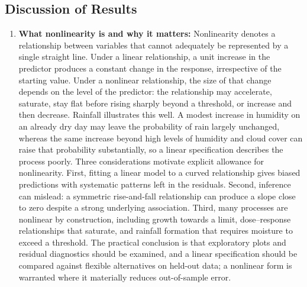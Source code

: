 \documentclass[conference]{IEEEtran}
\begin{document}
\subsection{Discussion of Results}
\begin{enumerate}
    \item \textbf{What nonlinearity is and why it matters:} Nonlinearity denotes a relationship between variables that cannot adequately be represented by a single straight line. Under a linear relationship, a unit increase in the predictor produces a constant change in the response, irrespective of the starting value. Under a nonlinear relationship, the size of that change depends on the level of the predictor: the relationship may accelerate, saturate, stay flat before rising sharply beyond a threshold, or increase and then decrease. Rainfall illustrates this well. A modest increase in humidity on an already dry day may leave the probability of rain largely unchanged, whereas the same increase beyond high levels of humidity and cloud cover can raise that probability substantially, so a linear specification describes the process poorly. Three considerations motivate explicit allowance for nonlinearity. First, fitting a linear model to a curved relationship gives biased predictions with systematic patterns left in the residuals. Second, inference can mislead: a symmetric rise-and-fall relationship can produce a slope close to zero despite a strong underlying association. Third, many processes are nonlinear by construction, including growth towards a limit, dose--response relationships that saturate, and rainfall formation that requires moisture to exceed a threshold. The practical conclusion is that exploratory plots and residual diagnostics should be examined, and a linear specification should be compared against flexible alternatives on held-out data; a nonlinear form is warranted where it materially reduces out-of-sample error.


\end{enumerate}
\end{document}
